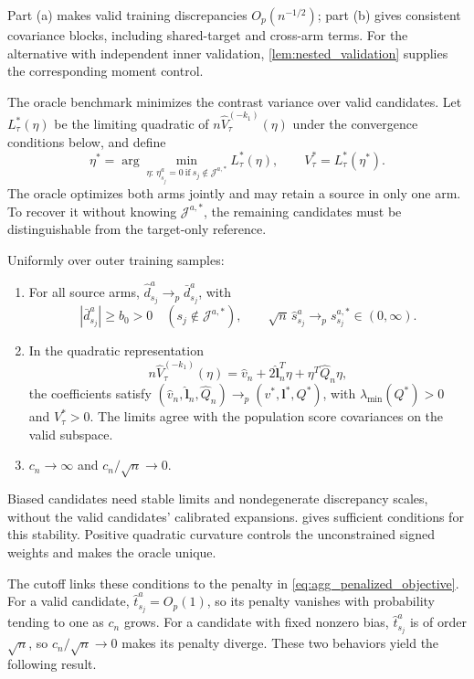 \documentclass[12pt]{article}
\begin{document}
Part (a) makes valid training discrepancies $O_p(n^{-1/2})$; part (b) gives consistent covariance blocks, including shared-target and cross-arm terms. For the alternative with independent inner validation, \cref{lem:nested_validation} supplies the corresponding moment control.

The oracle benchmark minimizes the contrast variance over valid candidates. Let $L_\tau^*(\eta)$ be the limiting quadratic of $n\widehat V_\tau^{(-k_1)}(\eta)$ under the convergence conditions below, and define
\[
\eta^*=\arg\min_{\eta:\,\eta_{s_j}^a=0\ \mathrm{if}\ s_j\notin\mathcal J^{a,*}}L_\tau^*(\eta),
\qquad V_\tau^*=L_\tau^*(\eta^*).
\]
The oracle optimizes both arms jointly and may retain a source in only one arm. To recover it without knowing $\mathcal J^{a,*}$, the remaining candidates must be distinguishable from the target-only reference.

\begin{assumption}\label{asmp:main_aggregation}
Uniformly over outer training samples:
\begin{enumerate}[label=(\alph*),leftmargin=*]
\item For all source arms, $\widehat d_{s_j}^a\to_p\bar d_{s_j}^a$, with
\[
|\bar d_{s_j}^a|\ge b_0>0\quad(s_j\notin\mathcal J^{a,*}),
\qquad \sqrt n\,\widehat s_{s_j}^a\to_p s_{s_j}^{a,*}\in(0,\infty).
\]
\item In the quadratic representation
\[
n\widehat V_\tau^{(-k_1)}(\eta)=\widehat v_n+2\widehat{\boldsymbol l}_n^T\eta+\eta^T\widehat Q_n\eta,
\]
the coefficients satisfy $(\widehat v_n,\widehat{\boldsymbol l}_n,\widehat Q_n)\to_p(v^*,\boldsymbol l^*,Q^*)$, with $\lambda_{\min}(Q^*)>0$ and $V_\tau^*>0$. The limits agree with the population score covariances on the valid subspace.
\item $c_n\to\infty$ and $c_n/\sqrt n\to0$.
\end{enumerate}
\end{assumption}

Biased candidates need stable limits and nondegenerate discrepancy scales, without the valid candidates' calibrated expansions.  gives sufficient conditions for this stability. Positive quadratic curvature controls the unconstrained signed weights and makes the oracle unique.

The cutoff links these conditions to the penalty in \cref{eq:agg_penalized_objective}. For a valid candidate, $\widehat t_{s_j}^a=O_p(1)$, so its penalty vanishes with probability tending to one as $c_n$ grows. For a candidate with fixed nonzero bias, $\widehat t_{s_j}^a$ is of order $\sqrt n$, so $c_n/\sqrt n\to0$ makes its penalty diverge. These two behaviors yield the following result.
\end{document}
